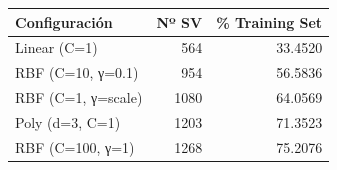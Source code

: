 \begin{tabular}{lrr}
\toprule
Configuración & Nº SV & \% Training Set \\
\midrule
Linear (C=1) & 564 & 33.4520 \\
RBF (C=10, γ=0.1) & 954 & 56.5836 \\
RBF (C=1, γ=scale) & 1080 & 64.0569 \\
Poly (d=3, C=1) & 1203 & 71.3523 \\
RBF (C=100, γ=1) & 1268 & 75.2076 \\
\bottomrule
\end{tabular}
